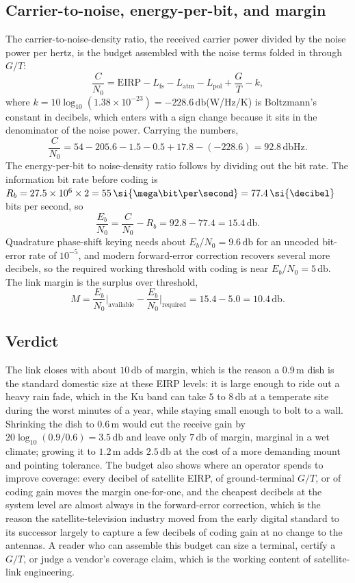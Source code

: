 \subsection{Carrier-to-noise, energy-per-bit, and margin}

The carrier-to-noise-density ratio, the received carrier power divided by
the noise power per hertz, is the budget assembled with the noise terms
folded in through $G/T$:
\[
\frac{C}{N_{0}} = \text{EIRP} - L_{\text{fs}} - L_{\text{atm}} -
L_{\text{pol}} + \frac{G}{T} - k,
\]
where $k = 10\log_{10}(1.38\times 10^{-23}) = -228.6\,\si{\decibel}$(W/Hz/K)
is Boltzmann's constant in decibels, which enters with a sign change
because it sits in the denominator of the noise power. Carrying the
numbers,
\[
\frac{C}{N_{0}} = 54 - 205.6 - 1.5 - 0.5 + 17.8 - (-228.6) = 92.8\,\si{
\decibel}\text{Hz}.
\]
The energy-per-bit to noise-density ratio follows by dividing out the bit
rate. The information bit rate before coding is $R_{b} = 27.5\times 10^{6}
\times 2 = 55\,\si{\mega\bit\per\second} = 77.4\,\si{\decibel}$ bits per
second, so
\[
\frac{E_{b}}{N_{0}} = \frac{C}{N_{0}} - R_{b} = 92.8 - 77.4 =
15.4\,\si{\decibel}.
\]
Quadrature phase-shift keying needs about $E_{b}/N_{0} = 9.6\,\si{
\decibel}$ for an uncoded bit-error rate of $10^{-5}$, and modern
forward-error correction recovers several more decibels, so the required
working threshold with coding is near $E_{b}/N_{0} = 5\,\si{\decibel}$.
The link margin is the surplus over threshold,
\[
M = \frac{E_{b}}{N_{0}}\bigg|_{\text{available}} - \frac{E_{b}}{N_{0}}
\bigg|_{\text{required}} = 15.4 - 5.0 = 10.4\,\si{\decibel}.
\]



\subsection{Verdict}

The link closes with about $10\,\si{\decibel}$ of margin, which is the
reason a $0.9\,\si{\meter}$ dish is the standard domestic size at these
EIRP levels: it is large enough to ride out a heavy rain fade, which in
the Ku band can take $5$ to $8\,\si{\decibel}$ at a temperate site during
the worst minutes of a year, while staying small enough to bolt to a
wall. Shrinking the dish to $0.6\,\si{\meter}$ would cut the receive gain
by $20\log_{10}(0.9/0.6) = 3.5\,\si{\decibel}$ and leave only
$7\,\si{\decibel}$ of margin, marginal in a wet climate; growing it to
$1.2\,\si{\meter}$ adds $2.5\,\si{\decibel}$ at the cost of a more
demanding mount and pointing tolerance. The budget also shows where an
operator spends to improve coverage: every decibel of satellite EIRP, of
ground-terminal $G/T$, or of coding gain moves the margin one-for-one,
and the cheapest decibels at the system level are almost always in the
forward-error correction, which is the reason the satellite-television
industry moved from the early digital standard to its successor largely
to capture a few decibels of coding gain at no change to the antennas. A
reader who can assemble this budget can size a terminal, certify a
$G/T$, or judge a vendor's coverage claim, which is the working content
of satellite-link engineering.

